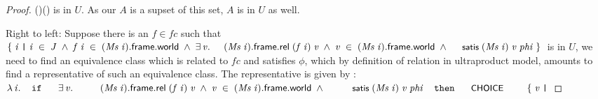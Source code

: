 \documentclass[letterpaper]{article}
\renewcommand{\HOLConst}[1]{{\textsf{\upshape\small #1}}}
\renewcommand{\HOLinline}[1]{\ensuremath{#1}}
\renewcommand{\HOLKeyword}[1]{\texttt{#1}}
\begin{document}
\begin{proof}
{\HOLTokenLeftbrace{}\;\HOLTokenBar{}\;\;\HOLSymConst{\HOLTokenIn{}}\;\;\HOLSymConst{\HOLTokenConj{}}\;\HOLConst{satis}\;(\;)\;(\;)\;\HOLTokenRightbrace{}} is in $U$. As our $A$ is a supset of this set, $A$ is in $U$ as well.

Right to left: Suppose there is an $f\in fc$ such that \HOLinline{\HOLTokenLeftbrace{}\HOLBoundVar{i}\;\HOLTokenBar{}\\
\;\HOLBoundVar{i}\;\HOLSymConst{\HOLTokenIn{}}\;\HOLFreeVar{J}\;\HOLSymConst{\HOLTokenConj{}}\;\HOLFreeVar{f}\;\HOLBoundVar{i}\;\HOLSymConst{\HOLTokenIn{}}\;(\HOLFreeVar{Ms}\;\HOLBoundVar{i}).\HOLFieldName{frame}.\HOLFieldName{world}\;\HOLSymConst{\HOLTokenConj{}}\\
\;\HOLSymConst{\HOLTokenExists{}}\HOLBoundVar{v}.\\
\;\;\;\;\;(\HOLFreeVar{Ms}\;\HOLBoundVar{i}).\HOLFieldName{frame}.\HOLFieldName{rel}\;(\HOLFreeVar{f}\;\HOLBoundVar{i})\;\HOLBoundVar{v}\;\HOLSymConst{\HOLTokenConj{}}\;\HOLBoundVar{v}\;\HOLSymConst{\HOLTokenIn{}}\;(\HOLFreeVar{Ms}\;\HOLBoundVar{i}).\HOLFieldName{frame}.\HOLFieldName{world}\;\HOLSymConst{\HOLTokenConj{}}\\
\;\;\;\;\;\HOLConst{satis}\;(\HOLFreeVar{Ms}\;\HOLBoundVar{i})\;\HOLBoundVar{v}\;\HOLFreeVar{phi}\HOLTokenRightbrace{}} is in $U$, we need to find an equivalence class which is related to $fc$ and satisfies $\phi$, which by definition of relation in ultraproduct model, amounts to find a representative of such an equivalence class. The representative is given by :
\HOLinline{\HOLTokenLambda{}\HOLBoundVar{i}.\\
\;\;\;\;\HOLKeyword{if}\\
\;\;\;\;\;\;\HOLSymConst{\HOLTokenExists{}}\HOLBoundVar{v}.\\
\;\;\;\;\;\;\;\;\;\;(\HOLFreeVar{Ms}\;\HOLBoundVar{i}).\HOLFieldName{frame}.\HOLFieldName{rel}\;(\HOLFreeVar{f}\;\HOLBoundVar{i})\;\HOLBoundVar{v}\;\HOLSymConst{\HOLTokenConj{}}\;\HOLBoundVar{v}\;\HOLSymConst{\HOLTokenIn{}}\;(\HOLFreeVar{Ms}\;\HOLBoundVar{i}).\HOLFieldName{frame}.\HOLFieldName{world}\;\HOLSymConst{\HOLTokenConj{}}\\
\;\;\;\;\;\;\;\;\;\;\HOLConst{satis}\;(\HOLFreeVar{Ms}\;\HOLBoundVar{i})\;\HOLBoundVar{v}\;\HOLFreeVar{phi}\\
\;\;\;\;\HOLKeyword{then}\\
\;\;\;\;\;\;\HOLConst{CHOICE}\\
\;\;\;\;\;\;\;\;\HOLTokenLeftbrace{}\HOLBoundVar{v}\;\HOLTokenBar{}\\
}
\end{proof}
\end{document}
